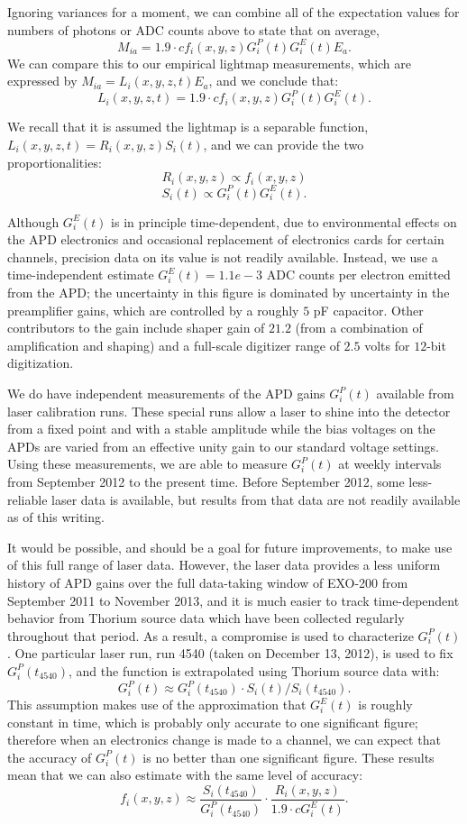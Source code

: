 Ignoring variances for a moment, we can combine all of the expectation values for numbers of photons or ADC counts above to state that on average,
\[M_{ia} = 1.9 \cdot c f_i(x,y,z) G^P_i(t) G^E_i(t) E_a.\]
We can compare this to our empirical lightmap measurements, which are expressed by $M_{ia} = L_i(x,y,z,t) E_a$,
and we conclude that:
\[ L_i(x,y,z,t) = 1.9 \cdot c f_i(x,y,z) G^P_i(t) G^E_i(t).\]

We recall that it is assumed the lightmap is a separable function, $L_i(x,y,z,t) = R_i(x,y,z)S_i(t)$, and we can provide the two proportionalities:
\[ R_i(x,y,z) \propto f_i(x,y,z) \]
\[ S_i(t) \propto G^P_i(t) G^E_i(t).\]

Although $G^E_i(t)$ is in principle time-dependent, due to environmental effects on the APD electronics and occasional replacement of electronics cards for certain channels, precision data on its value is not readily available.  Instead, we use a time-independent estimate $G^E_i(t) = 1.1e-3$ ADC counts per electron emitted from the APD; the uncertainty in this figure is dominated by uncertainty in the preamplifier gains, which are controlled by a roughly $5$ pF capacitor.  Other contributors to the gain include shaper gain of $21.2$ (from a combination of amplification and shaping) and a full-scale digitizer range of $2.5$ volts for $12$-bit digitization.

We do have independent measurements of the APD gains $G^P_i(t)$ available from laser calibration runs.  These special runs allow a laser to shine into the detector from a fixed point and with a stable amplitude while the bias voltages on the APDs are varied from an effective unity gain to our standard voltage settings.  Using these measurements, we are able to measure $G^P_i(t)$ at weekly intervals from September 2012 to the present time.  Before September 2012, some less-reliable laser data is available, but results from that data are not readily available as of this writing.

It would be possible, and should be a goal for future improvements, to make use of this full range of laser data.  However, the laser data provides a less uniform history of APD gains over the full data-taking window of EXO-200 from September 2011 to November 2013, and it is much easier to track time-dependent behavior from Thorium source data which have been collected regularly throughout that period.  As a result, a compromise is used to characterize $G^P_i(t)$.  One particular laser run, run 4540 (taken on December 13, 2012), is used to fix $G^P_i(t_{4540})$, and the function is extrapolated using Thorium source data with:
\[G^P_i(t) \approx G^P_i(t_{4540}) \cdot S_i(t)/S_i(t_{4540}).\]
This assumption makes use of the approximation that $G^E_i(t)$ is roughly constant in time, which is probably only accurate to one significant figure; therefore when an electronics change is made to a channel, we can expect that the accuracy of $G^P_i(t)$ is no better than one significant figure.  These results mean that we can also estimate with the same level of accuracy:
\[f_i(x,y,z) \approx \frac{S_i(t_{4540})}{G^P_i(t_{4540})} \cdot \frac{R_i(x,y,z)}{1.9 \cdot c G^E_i(t)}.\]

